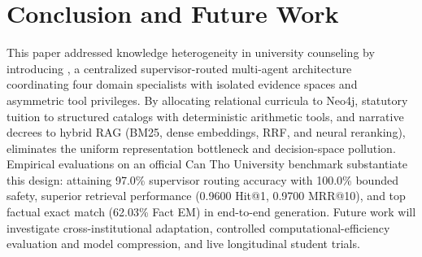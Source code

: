 \section{Conclusion and Future Work}
\label{sec:conclusion}

This paper addressed knowledge heterogeneity in university counseling by introducing \system{}, a centralized supervisor-routed multi-agent architecture coordinating four domain specialists with isolated evidence spaces and asymmetric tool privileges. By allocating relational curricula to Neo4j, statutory tuition to structured catalogs with deterministic arithmetic tools, and narrative decrees to hybrid RAG (BM25, dense embeddings, RRF, and neural reranking), \system{} eliminates the uniform representation bottleneck and decision-space pollution. Empirical evaluations on an official Can Tho University benchmark substantiate this design: attaining 97.0\% supervisor routing accuracy with 100.0\% bounded safety, superior retrieval performance (0.9600 Hit@1, 0.9700 MRR@10), and top factual exact match (62.03\% Fact EM) in end-to-end generation. Future work will investigate cross-institutional adaptation, controlled computational-efficiency evaluation and model compression, and live longitudinal student trials.
